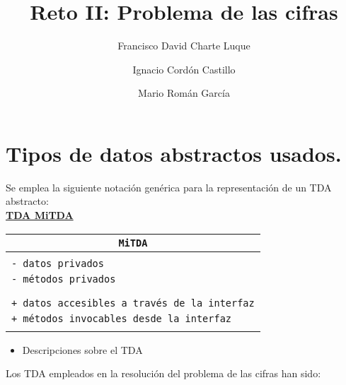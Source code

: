 \documentclass[a4paper,10pt]{scrartcl}
\title{Reto II: Problema de las cifras}
\author{Francisco David Charte Luque \and 
        Ignacio Cordón Castillo \and
        Mario Román García}
\date{}
\newcommand{\objeto}[4]{\indent\underline{\textbf{TDA #1}}
            \begin{center}\begin{tabular}{|p{7cm}|}
                 \hline
                 \multicolumn{1}{|c|}{\texttt{#1}}\\
                 \hline
                  \\#2\\\\
                 \hline
                 \\#3\\\\
                 \hline
            \end{tabular}\end{center}
            \begin{itemize}
            #4
            \end{itemize}
               }
\def\C++#1{\texttt{#1}}
\begin{document}
\maketitle

\tableofcontents

\newpage
\section{Tipos de datos abstractos usados.}

Se emplea la siguiente notación genérica para la representación 
de un TDA abstracto:\\

\objeto{MiTDA}{
		\C++{- datos privados}\\
		\C++{- métodos privados}
	}{
		\C++{+ datos accesibles a través de la interfaz}\\
		\C++{+ métodos invocables desde la interfaz}
	}{\item Descripciones sobre el TDA}

\bigskip
Los TDA empleados en la resolución del problema de las cifras han sido:\\
\end{document}
